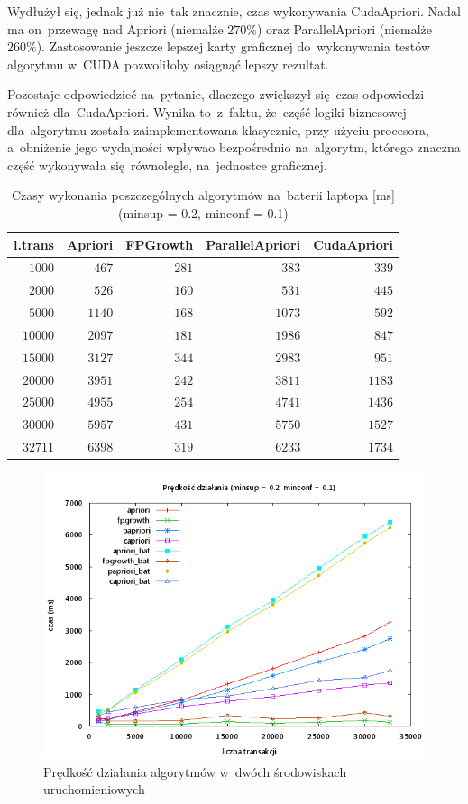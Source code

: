 Wydłużył się, jednak już nie~tak znacznie, czas wykonywania CudaApriori. Nadal ma on~przewagę nad Apriori (niemalże $270\%$) oraz ParallelApriori (niemalże $260\%$). Zastosowanie jeszcze lepszej karty graficznej do~wykonywania testów algorytmu w~CUDA pozwoliłoby osiągnąć lepszy rezultat.

Pozostaje odpowiedzieć na~pytanie, dlaczego zwiększył się~czas odpowiedzi również dla~CudaApriori. Wynika to~z~faktu, że~część logiki biznesowej dla~algorytmu została zaimplementowana klasycznie, przy użyciu procesora, a~obniżenie jego wydajności wpływao bezpośrednio na~algorytm, którego znaczna część wykonywała się~równolegle, na~jednostce graficznej.

\begin{table}
	\centering
	\begin{tabular}{r|r|r|r|r}
	\textbf{l.trans} & \textbf{Apriori} & \textbf{FPGrowth} & \textbf{ParallelApriori} & \textbf{CudaApriori}  \\ \hline
	$1000$ & $467$ & $281$ & $383$ & $339$ \\
	$2000$ & $526$ & $160$ & $531$ & $445$ \\
	$5000$ & $1140$ & $168$ & $1073$ & $592$ \\
	$10000$ & $2097$ & $181$ & $1986$ & $847$ \\
	$15000$ & $3127$ & $344$ & $2983$ & $951$ \\
	$20000$ & $3951$ & $242$ & $3811$ & $1183$ \\
	$25000$ & $4955$ & $254$ & $4741$ & $1436$ \\
	$30000$ & $5957$ & $431$ & $5750$ & $1527$ \\
	$32711$ & $6398$ & $319$ & $6233$ & $1734$ \\
	\end{tabular}
	\caption{Czasy wykonania poszczególnych algorytmów na~baterii laptopa [ms] (minsup = 0.2, minconf = 0.1)\label{tab:02_01_bat}}
\end{table}

\begin{figure}[H]
\centering
\includegraphics[width=1.1\textwidth]{figures/06/02_01_all.png}
\caption{Prędkość działania algorytmów w~dwóch środowiskach uruchomieniowych\label{rys:02_01_all}}
\end{figure}


